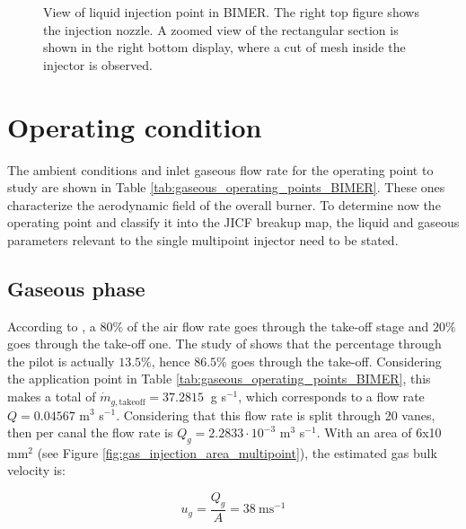\begin{figure}[h!]
	\centering
	\caption[View of liquid injection point in BIMER]{View of liquid injection point in BIMER. The right top figure shows the injection nozzle. A zoomed view of the rectangular section is shown in the right bottom display, where a cut of mesh inside the injector is observed.}
	\label{fig:BIMER_liquid_injector_views}
\end{figure}

\clearpage

\section{Operating condition}

The ambient conditions and inlet gaseous flow rate for the operating point to study are shown in Table \ref{tab:gaseous_operating_points_BIMER}. These ones characterize the aerodynamic field of the overall burner. To determine now the operating point and classify it into the JICF breakup map, the liquid and gaseous parameters relevant to the single multipoint injector need to be stated.

\subsection{Gaseous phase}

According to , a $80 \%$ of the air flow rate goes through the take-off stage and $20 \%$ goes through the take-off one. The study of  shows that the percentage through the pilot is actually $13.5 \%$, hence $86.5 \%$ goes through the take-off. Considering the application point in Table \ref{tab:gaseous_operating_points_BIMER}, this makes a total of $\dot{m}_{g,\mathrm{takeoff}} = 37.2815 ~ $ g s$^{-1}$, which corresponds to a flow rate $Q = 0.04567 $ m$^{3}$ s$^{-1}$. Considering that this flow rate is split through 20 vanes, then per canal the flow rate is $Q_g = 2.2833 \cdot 10^{-3}$ m$^{3}$ s$^{-1}$. With an area of 6x10 mm$^2$ (see Figure \ref{fig:gas_injection_area_multipoint}), the estimated gas bulk velocity is:

\begin{equation}
u_g = \frac{Q_g}{A} = 38 ~ \mathrm{m} \mathrm{s}^{-1}
\end{equation}

